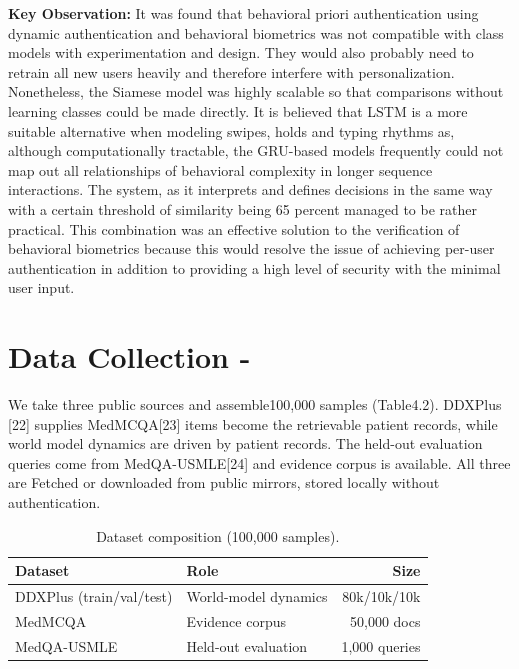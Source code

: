 \textbf{Key Observation:}
It was found that behavioral priori authentication using dynamic authentication and behavioral biometrics was not compatible with class models with experimentation and design. They would also probably need to retrain all new users heavily and therefore interfere with personalization. Nonetheless, the Siamese model was highly scalable so that comparisons without learning classes could be made directly. It is believed that LSTM is a more suitable alternative when modeling swipes, holds and typing rhythms as, although computationally tractable, the GRU-based models frequently could not map out all relationships of behavioral complexity in longer sequence interactions.
The system, as it interprets and defines decisions in the same way with a certain threshold of similarity being 65 percent managed to be rather practical. This combination was an effective solution to the verification of behavioral biometrics because this would resolve the issue of achieving per-user authentication in addition to providing a high level of security with the minimal user input.

\section{Data Collection -}
We take three public sources and assemble100,000 samples (Table4.2). DDXPlus [22] supplies
MedMCQA[23] items become the retrievable patient records, while world model dynamics are driven by patient records.
The held-out evaluation queries come from MedQA-USMLE[24] and evidence corpus is available. All three are
Fetched or downloaded from public mirrors, stored locally without authentication.

\begin{table}[H]
\centering
\caption{Dataset composition (100,000 samples).}
\label{tab:dataset}
\begin{tabular}{l l r}
\hline
\textbf{Dataset} & \textbf{Role} & \textbf{Size} \\
\hline
DDXPlus (train/val/test) & World-model dynamics & 80k/10k/10k \\
MedMCQA & Evidence corpus & 50,000 docs \\
MedQA-USMLE & Held-out evaluation & 1,000 queries \\
\hline
\end{tabular}
\end{table}


